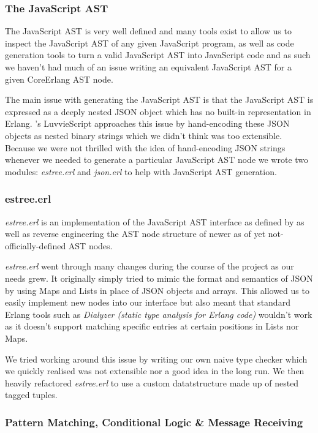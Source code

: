 \documentclass[twoside,12pt,titlepage,a4paper]{article}
\begin{document}
\subsubsection{The JavaScript AST}
The JavaScript AST is very well defined and many tools exist to allow us to inspect the JavaScript AST of any given JavaScript program, as well as code generation tools to turn a valid JavaScript AST into JavaScript code and as such we haven't had much of an issue writing an equivalent JavaScript AST for a given CoreErlang AST node.

The main issue with generating the JavaScript AST is that the JavaScript AST is expressed as a deeply nested JSON object which has no built-in representation in Erlang. \cite{luvvieGitHub}'s LuvvieScript approaches this issue by hand-encoding these JSON objects as nested binary strings which we didn't think was too extensible. Because we were not thrilled with the idea of hand-encoding JSON strings whenever we needed to generate a particular JavaScript AST node we wrote two modules: \textit{estree.erl} and \textit{json.erl} to help with JavaScript AST generation.

\subsubsection{estree.erl}
\textit{estree.erl} is an implementation of the JavaScript AST interface as defined by \cite{EStreeMDN} as well as reverse engineering the AST node structure of newer as of yet not-officially-defined AST nodes.

\textit{estree.erl} went through many changes during the course of the project as our needs grew. It originally simply tried to mimic the format and semantics of JSON by using Maps and Lists in place of JSON objects and arrays. This allowed us to easily implement new nodes into our interface but also meant that standard Erlang tools such as \textit{Dialyzer (static type analysis for Erlang code)} wouldn't work as it doesn't support matching specific entries at certain positions in Lists nor Maps. 

We tried working around this issue by writing our own naive type checker which we quickly realised was not extensible nor a good idea in the long run. We then heavily refactored \textit{estree.erl} to use a custom datatstructure made up of nested tagged tuples. 

\subsubsection{Pattern Matching, Conditional Logic \& Message Receiving}
\end{document}
